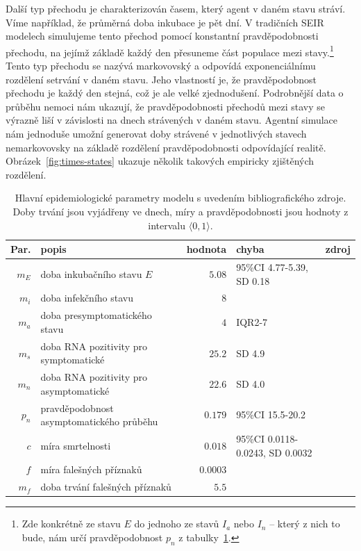 Další typ přechodu je charakterizován časem, který agent v daném stavu stráví. Víme například, že průměrná doba inkubace je pět dní. V tradičních SEIR modelech simulujeme tento přechod pomocí konstantní pravděpodobnosti přechodu, na jejímž základě každý den přesuneme část populace mezi stavy.\footnote{Zde konkrétně ze stavu $E$ do jednoho ze stavů $I_a$ nebo $I_n$ -- který z nich to bude, nám určí pravděpodobnost $p_n$ z tabulky~\ref{paramtab}.} Tento typ přechodu se nazývá markovovský a odpovídá exponenciálnímu rozdělení setrvání v daném stavu. Jeho vlastností je, že pravděpodobnost přechodu je každý den stejná, což je ale velké zjednodušení. Podrobnější data o průběhu nemoci nám ukazují, že pravděpodobnosti přechodů mezi stavy se výrazně liší v závislosti na dnech strávených v daném stavu. Agentní simulace nám jednoduše umožní generovat doby strávené v jednotlivých stavech nemarkovovsky na základě rozdělení pravděpodobnosti odpovídající realitě. Obrázek~\ref{fig:times-states} ukazuje několik takových empiricky zjištěných rozdělení.   


\begin{table} 
\begin{center}
\footnotesize
\begin{tabular}{rp{3.4cm}rp{3cm}l}
\hline
Par.&	popis &	hodnota &	chyba &	zdroj \\ \hline\hline
$m_E$&	 doba inkubačního stavu $E$ 	&$5.08$&	95\%CI 4.77-5.39, SD 0.18&	\cite{he2020estimation}	\\
$m_i$&	 doba infekčního stavu  	&$8$&	&	\cite{Wolfel2020virological}	\\
$m_a$&	 doba presymptomatického stavu 	&$4$&	IQR2-7&	\cite{nie2020epidemiological}	\\
$m_s$&	 doba RNA pozitivity pro symptomatické 	&$25.2$&	SD 4.9&	\cite{noh2020asymptomatic}	\\
$m_n$&	 doba RNA pozitivity pro asymptomatické 	&$22.6$&	SD 4.0&	\cite{noh2020asymptomatic}	\\
$p_n$&	 pravděpodobnost asymptomatického průběhu 	&$0.179$&	95\%CI 15.5-20.2&	\cite{mizumoto2020estimating}	\\
$c$&	 míra smrtelnosti 	&$0.018$&	95\%CI 0.0118-0.0243, SD 0.0032&	\cite{he2020estimation}	\\
$f$&	 míra falešných příznaků 	&$0.0003$&	&	\cite{szu2020}	\\
$m_f$&	 doba trvání falešných příznaků 	&$5.5$&	&	\cite{szu2020}	\\
\hline
\end{tabular}
\caption{Hlavní epidemiologické parametry modelu s uvedením bibliografického zdroje. Doby trvání jsou vyjádřeny ve dnech, míry a pravděpodobnosti jsou hodnoty z intervalu $\langle 0,1 \rangle$. }
\label{paramtab}
\end{center}
\end{table}

